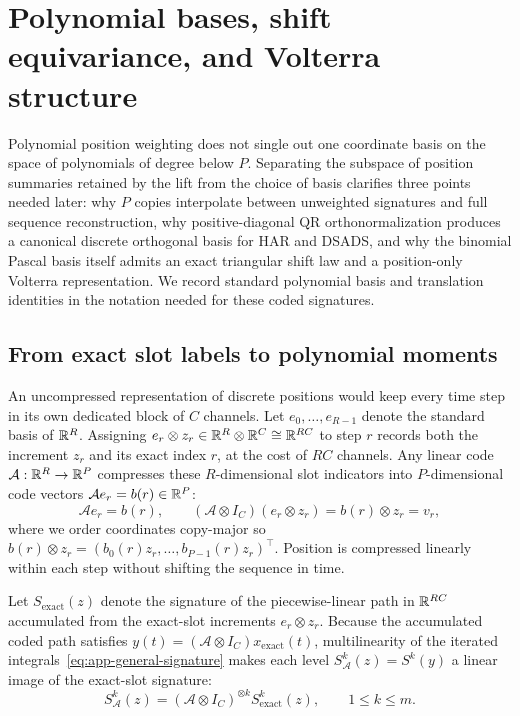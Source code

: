 \section{Polynomial bases, shift equivariance, and Volterra structure}
\label{app:offsets}

Polynomial position weighting does not single out one coordinate basis on the
space of polynomials of degree below \(P\). Separating the subspace of position
summaries retained by the lift from the choice of basis clarifies three points
needed later: why \(P\) copies interpolate between unweighted signatures and full
sequence reconstruction, why positive-diagonal QR orthonormalization produces a
canonical discrete orthogonal basis for HAR and DSADS, and why the binomial
Pascal basis itself admits an exact triangular shift law and a position-only
Volterra representation.
We record standard polynomial basis and translation identities in the notation
needed for these coded signatures.

\subsection{From exact slot labels to polynomial moments}
An uncompressed representation of discrete positions would keep every time step
in its own dedicated block of \(C\) channels. Let \(e_0, \ldots, e_{R-1}\) denote
the standard basis of \(\mathbb{R}^R\). Assigning \(e_r \otimes z_r \in \mathbb{R}^R \otimes \mathbb{R}^C \cong \mathbb{R}^{RC}\)
to step \(r\) records both the increment \(z_r\) and its exact index \(r\), at
the cost of \(RC\) channels. Any linear code \(\mathcal A : \mathbb{R}^R \to \mathbb{R}^P\)
compresses these \(R\)-dimensional slot indicators into \(P\)-dimensional code
vectors \(\mathcal A e_r = b(r) \in \mathbb{R}^P\):
\begin{equation}\label{eq:offset-code}
 \mathcal A e_r = b(r), \qquad
 (\mathcal A \otimes I_C)(e_r \otimes z_r) = b(r) \otimes z_r = v_r,
\end{equation}
where we order coordinates copy-major so \(b(r) \otimes z_r = (b_0(r) z_r, \ldots, b_{P-1}(r) z_r)^\top\).
Position is compressed linearly within each step without shifting the sequence
in time.

Let \(S_{\mathrm{exact}}(z)\) denote the signature of the piecewise-linear path
in \(\mathbb{R}^{RC}\) accumulated from the exact-slot increments \(e_r \otimes z_r\).
Because the accumulated coded path satisfies \(y(t) = (\mathcal A \otimes I_C) x_{\mathrm{exact}}(t)\),
multilinearity of the iterated integrals~\eqref{eq:app-general-signature} makes
each level \(S^k_{\mathcal A}(z) = S^k(y)\) a linear image of the exact-slot
signature:
\begin{equation}\label{eq:offset-projection}
 S^k_{\mathcal A}(z) = (\mathcal A \otimes I_C)^{\otimes k} S^k_{\mathrm{exact}}(z),
 \qquad 1 \leq k \leq m.
\end{equation}

